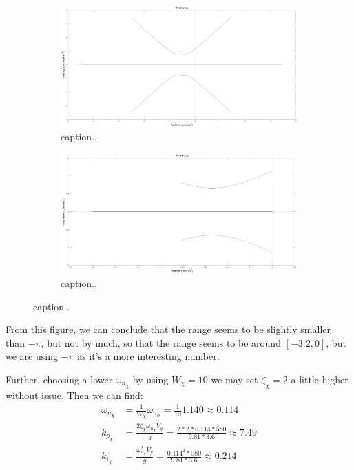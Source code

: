 \subsection{}
\begin{figure}[ht]
	\centering
	\begin{subfigure}[b]{0.45\textwidth}
		\includegraphics[width=\textwidth]{figures/root_locus_k_i_phi}
		\caption{caption..}
		\label{fig:root_locus_large_range}
	\end{subfigure}
	\begin{subfigure}[b]{0.45\textwidth}
		\includegraphics[width=\textwidth]{figures/root_locus_k_i_phi_interval_minus_pi_to_0}
		\caption{caption..}
		\label{fig:root_locus_proper_range}
	\end{subfigure}
\end{figure}

From this figure, we can conclude that the range seems to be slightly smaller than $-\pi$, but not by much, so that the range seems to be around $[-3.2, 0]$, but we are using $-\pi$ as it's a more interesting number. 

Further, choosing a lower $\omega_{n_\chi}$ by using $W_\chi = 10$ we may set $\zeta_\chi = 2$ a little higher without issue. Then we can find:
\begin{align*}
    \omega_{n_\chi} &= \frac{1}{W_\chi} \omega_{n_\phi} 
    = \frac{1}{10} 1.140 \approx 0.114 \\
    k_{p_\chi} &= \frac{2 \zeta_\chi \omega_{n_\chi} V_g}{g} 
    = \frac{2 * 2 * 0.114 * 580}{9.81 * 3.6} 
    \approx 7.49 \\
    k_{i_\chi} &= \frac{\omega_{n_\chi}^2 V_g}{g}
    = \frac{0.114^2 * 580}{9.81 * 3.6} 
    \approx 0.214
\end{align*}

